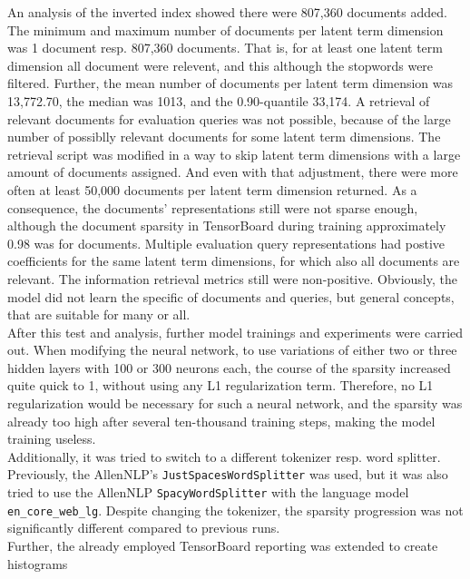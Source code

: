 An analysis of the inverted index showed there were 807,360 documents added.
The minimum and maximum number of documents per latent term dimension was 
    1 document resp. 807,360 documents.
That is, for at least one latent term dimension all document were relevent,
    and this although the stopwords were filtered.
Further, the mean number of documents per latent term dimension was 13,772.70, 
    the median was 1013, and the 0.90-quantile 33,174.
A retrieval of relevant documents for evaluation queries was not possible,
    because of the large number of possiblly relevant documents for some 
    latent term dimensions.
The retrieval script was modified in a way to skip latent term dimensions with
    a large amount of documents assigned.
And even with that adjustment, there were more often at least 50,000 documents per 
    latent term dimension returned.
As a consequence, the documents' representations still were not sparse enough, although 
    the document sparsity in TensorBoard during training approximately 0.98 was for documents.
Multiple evaluation query representations had postive coefficients
    for the same latent term dimensions, for which also all documents are relevant.
The information retrieval metrics still were non-positive.
Obviously, the model did not learn the specific of documents and queries, but general
    concepts, that are suitable for many or all.\\
After this test and analysis, further model trainings and experiments were carried out.
When modifying the neural network, to use variations of either two or three hidden layers 
    with 100 or 300 neurons each, 
    the course of the sparsity increased quite quick to 1, without using any L1 
    regularization term.
Therefore, no L1 regularization would be necessary for such a neural network,
    and the sparsity was already too high after several ten-thousand training steps,
    making the model training useless.\\
Additionally, it was tried to switch to a different tokenizer resp. word splitter.
Previously, the AllenNLP's \texttt{JustSpacesWordSplitter} was used,
    but it was also tried to use the AllenNLP \texttt{SpacyWordSplitter} with the 
    language model \texttt{en\_core\_web\_lg}.
Despite changing the tokenizer, the sparsity progression was not significantly different
    compared to previous runs. \\
Further, the already employed TensorBoard reporting was extended to create histograms
